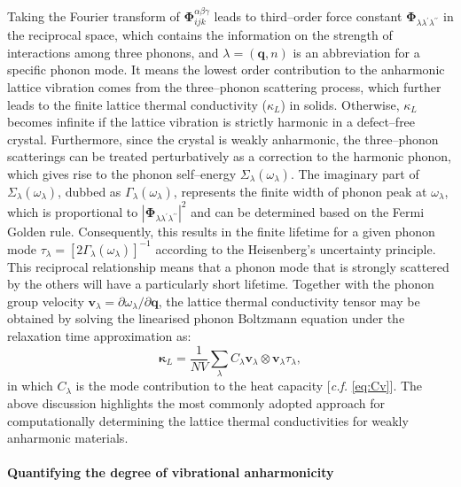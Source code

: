 Taking the Fourier transform of $\bm{\Phi}_{ijk}^{\alpha\beta\gamma}$ leads to third--order force constant $\bm{\Phi}_{\lambda\lambda^{\prime}\lambda^{\prime\prime}}$ in the reciprocal space, which contains the information on the strength of interactions among three phonons,\cite{phono3py} and $\lambda=(\bm{q},n)$ is an abbreviation for a specific phonon mode. It means the lowest order contribution to the anharmonic lattice vibration comes from the three--phonon scattering process,\cite{pathak1965theory} which further leads to the finite lattice thermal conductivity ($\kappa_L$) in solids. Otherwise, $\kappa_L$ becomes infinite if the lattice vibration is strictly harmonic in a defect--free crystal.\cite{allen1993thermal} Furthermore, since the crystal is weakly anharmonic, the three--phonon scatterings can be treated perturbatively as a correction to the harmonic phonon, which gives rise to the phonon self--energy $\Sigma_\lambda (\omega_\lambda)$. The imaginary part of $\Sigma_\lambda (\omega_\lambda)$, dubbed as $\Gamma_{\lambda}(\omega_\lambda)$,  represents the finite width  of phonon peak at $\omega_\lambda$, which is proportional to $|\bm{\Phi}_{\lambda\lambda^{\prime}\lambda^{\prime\prime}}|^2$ and can be determined based on the Fermi Golden rule.\cite{maradudin1962scattering} Consequently, this results in the finite lifetime for a given phonon mode $\tau_\lambda=[2\Gamma_{\lambda}(\omega_\lambda)]^{-1}$ according to the Heisenberg's uncertainty principle. This reciprocal relationship means that a phonon mode that is strongly scattered by the others will have a particularly short lifetime. Together with the phonon group velocity $\bm{v}_{\lambda}=\partial \omega_\lambda/\partial \bm{q}$, the lattice thermal conductivity tensor may be obtained by solving the linearised phonon Boltzmann equation under the relaxation time approximation as:\cite{chaput2013direct}
\begin{equation}\label{eq:ph_boltzmann}
    \bm{\kappa}_{L} = \frac{1}{NV}\sum_\lambda C_\lambda \bm{v}_{\lambda}\otimes \bm{v}_{\lambda} \tau_\lambda,
\end{equation}
in which $C_\lambda$ is the mode contribution to the heat capacity [\emph{c.f.} \cref{eq:Cv}]. The above discussion highlights the most commonly adopted approach for computationally determining the lattice thermal conductivities for weakly anharmonic materials.\cite{phono3py,li2014shengbte}  

\paragraph{\textbf{Quantifying the degree of vibrational anharmonicity}} 

